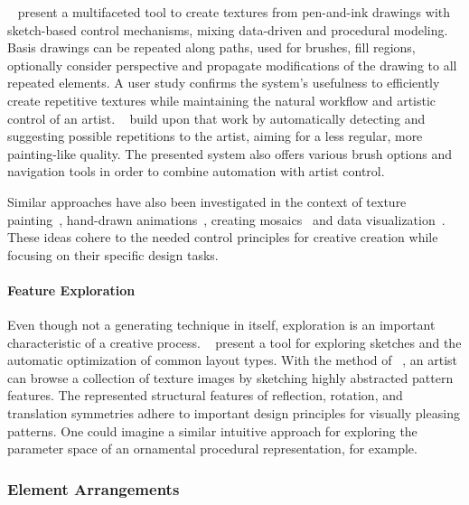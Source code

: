 \citeauthor*{kazi_2012_vit}~\cite{kazi_2012_vit} present a multifaceted tool to create textures from pen-and-ink drawings with sketch-based control mechanisms, mixing data-driven and procedural modeling. Basis drawings can be repeated along paths, used for brushes, fill regions, optionally consider perspective and propagate modifications of the drawing to all repeated elements. A user study confirms the system's usefulness to efficiently create repetitive textures while maintaining the natural workflow and artistic control of an artist. \citeauthor*{xing_2014_apr}~\cite{xing_2014_apr} build upon that work by automatically detecting and suggesting possible repetitions to the artist, aiming for a less regular, more painting-like quality. The presented system also offers various brush options and navigation tools in order to combine automation with artist control.

Similar approaches have also been investigated in the context of texture painting~\cite{lukac_2013_pft}, hand-drawn animations~\cite{xing_2015_aha}, creating mosaics~\cite{igarashi_2010_dde,abdrashitov_2014_msi} and data visualization~\cite{xia_2018_ddc}. These ideas cohere to the needed control principles for creative creation while focusing on their specific design tasks. 

\paragraph{Feature Exploration}
\label{para:analysis_rulebased_sketchbased_feature_exploration}

Even though not a generating technique in itself, exploration is an important characteristic of a creative process. \citeauthor*{todi_2016_sse}~\cite{todi_2016_sse} present a tool for exploring sketches and the automatic optimization of common layout types. With the method of \citeauthor*{chen_2016_msi}~\cite{chen_2016_msi}, an artist can browse a collection of texture images by sketching highly abstracted pattern features. The represented structural features of reflection, rotation, and translation symmetries adhere to important design principles for visually pleasing patterns. One could imagine a similar intuitive approach for exploring the parameter space of an ornamental procedural representation, for example.


\subsubsection{Element Arrangements}
\label{subsubsec:analysis_element_arrangements}

